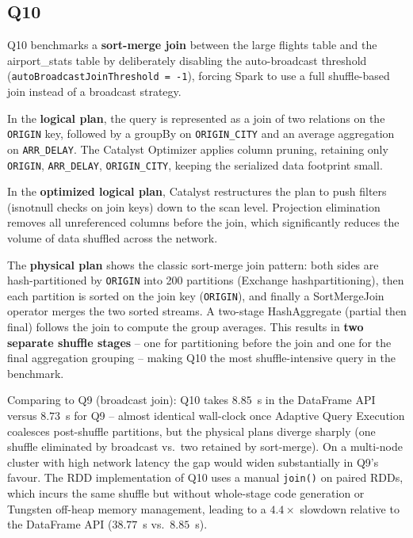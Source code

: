 \documentclass{article}
\begin{document}
\subsection{Q10}
Q10 benchmarks a \textbf{sort-merge join} between the large flights table and the airport\_stats table by deliberately disabling the auto-broadcast threshold (\texttt{autoBroadcastJoinThreshold = -1}), forcing Spark to use a full shuffle-based join instead of a broadcast strategy.

In the \textbf{logical plan}, the query is represented as a join of two relations on the \texttt{ORIGIN} key, followed by a groupBy on \texttt{ORIGIN\_CITY} and an average aggregation on \texttt{ARR\_DELAY}. The Catalyst Optimizer applies column pruning, retaining only \texttt{ORIGIN}, \texttt{ARR\_DELAY}, \texttt{ORIGIN\_CITY}, keeping the serialized data footprint small.

In the \textbf{optimized logical plan}, Catalyst restructures the plan to push filters (isnotnull checks on join keys) down to the scan level. Projection elimination removes all unreferenced columns before the join, which significantly reduces the volume of data shuffled across the network.

The \textbf{physical plan} shows the classic sort-merge join pattern: both sides are hash-partitioned by \texttt{ORIGIN} into 200 partitions (Exchange hashpartitioning), then each partition is sorted on the join key (\texttt{ORIGIN}), and finally a SortMergeJoin operator merges the two sorted streams. A two-stage HashAggregate (partial then final) follows the join to compute the group averages. This results in \textbf{two separate shuffle stages} -- one for partitioning before the join and one for the final aggregation grouping -- making Q10 the most shuffle-intensive query in the benchmark.

Comparing to Q9 (broadcast join): Q10 takes $8.85$~s in the DataFrame API versus $8.73$~s for Q9 -- almost identical wall-clock once Adaptive Query Execution coalesces post-shuffle partitions, but the physical plans diverge sharply (one shuffle eliminated by broadcast vs.\ two retained by sort-merge). On a multi-node cluster with high network latency the gap would widen substantially in Q9's favour. The RDD implementation of Q10 uses a manual \texttt{join()} on paired RDDs, which incurs the same shuffle but without whole-stage code generation or Tungsten off-heap memory management, leading to a $4.4\times$ slowdown relative to the DataFrame API ($38.77$~s vs.\ $8.85$~s).
\end{document}
